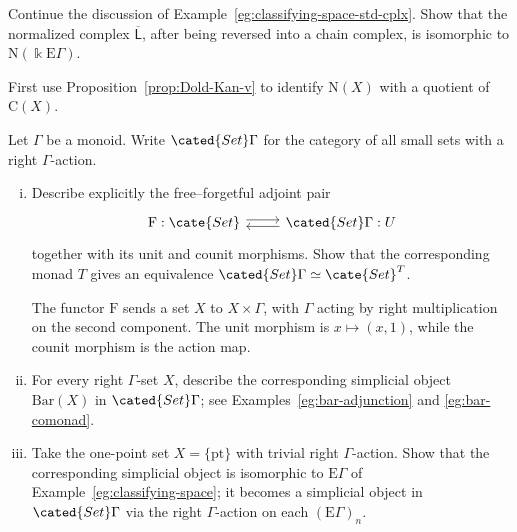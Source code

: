 	\item Continue the discussion of
	Example~\ref{eg:classifying-space-std-cplx}. Show that the normalized
	complex $\overline{\mathsf{L}}$, after being reversed into a chain complex,
	is isomorphic to $\mathrm{N}(\Bbbk\mathrm{E}\Gamma)$.
	\begin{hint}
		First use Proposition~\ref{prop:Dold-Kan-v} to identify $\mathrm{N}(X)$
		with a quotient of $\mathrm{C}(X)$.
	\end{hint}

	\item Let $\Gamma$ be a monoid. Write $\cated{Set}\Gamma$ for the category
	of all small sets with a right $\Gamma$-action.
	\begin{enumerate}[(i)]
		\item Describe explicitly the free--forgetful adjoint pair
		\[\begin{tikzcd}
			\mathrm{F}: \cate{Set} \arrow[shift left, r] & \cated{Set}\Gamma \arrow[shift left, l]: U
		\end{tikzcd}\]
		together with its unit and counit morphisms. Show that the corresponding
		monad $T$ gives an equivalence
		$\cated{Set}\Gamma\simeq\cate{Set}^T$.

		\begin{hint}
			The functor $\mathrm{F}$ sends a set $X$ to $X\times\Gamma$, with
			$\Gamma$ acting by right multiplication on the second component. The
			unit morphism is $x\mapsto(x,1)$, while the counit morphism is the
			action map.
		\end{hint}
		\item For every right $\Gamma$-set $X$, describe the corresponding
		simplicial object $\mathrm{Bar}(X)$ in $\cated{Set}\Gamma$; see
		Examples~\ref{eg:bar-adjunction} and \ref{eg:bar-comonad}.
		\item Take the one-point set $X=\{\mathrm{pt}\}$ with trivial right
		$\Gamma$-action. Show that the corresponding simplicial object is
		isomorphic to $\mathrm{E}\Gamma$ of
		Example~\ref{eg:classifying-space}; it becomes a simplicial object in
		$\cated{Set}\Gamma$ via the right $\Gamma$-action on each
		$(\mathrm{E}\Gamma)_n$.
	\end{enumerate}

